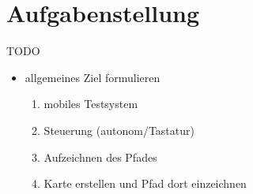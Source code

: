 \section{Aufgabenstellung}
\label{sec:aufgabenstellung}
TODO

\begin{itemize}
  \item allgemeines Ziel formulieren
    \begin{enumerate}
      \item mobiles Testsystem
      \item Steuerung (autonom/Tastatur)
      \item Aufzeichnen des Pfades
      \item Karte erstellen und Pfad dort einzeichnen
    \end{enumerate}
\end{itemize}

